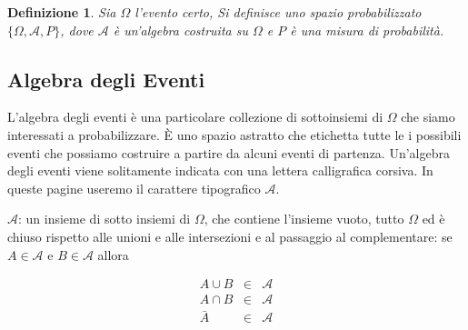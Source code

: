 \documentclass[
  11pt,
]{book}
\theoremstyle{mytheoremstyle}
\theoremstyle{mydefstyle}
\newtheorem{definition}{Definizione}[section]
\begin{document}
\begin{definition}
Sia \(\Omega\) l'evento certo, Si definisce uno spazio probabilizzato
\(\{\Omega,\mathscr{A},P\}\), dove \(\mathscr{A}\) è un'algebra costruita su
\(\Omega\) e \(P\) è una misura di probabilità.
\end{definition}

\subsection{Algebra degli Eventi}\label{algebra-degli-eventi-1}

L'algebra degli eventi è una particolare collezione di sottoinsiemi di
\(\Omega\) che siamo interessati a probabilizzare. È uno spazio astratto
che etichetta tutte le i possibili eventi che possiamo costruire a
partire da alcuni eventi di partenza. Un'algebra degli eventi viene
solitamente indicata con una lettera calligrafica corsiva. In queste
pagine useremo il carattere tipografico \(\mathscr{A}\).

\(\mathscr{A}\): un insieme di sotto insiemi di \(\Omega\), che contiene
l'insieme vuoto, tutto \(\Omega\) ed è chiuso rispetto alle unioni e alle
intersezioni e al passaggio al complementare: se \(A\in\mathscr{A}\) e
\(B\in\mathscr{A}\) allora

\begin{eqnarray*}
  A\cup B &\in& \mathscr{A}\\
  A\cap B &\in& \mathscr{A}\\
  \bar A &\in& \mathscr{A}
  \end{eqnarray*}
\end{document}
